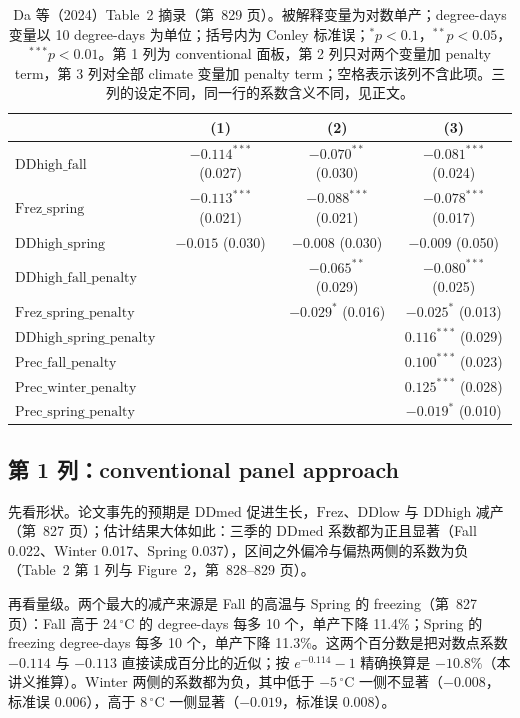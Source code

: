 \begin{table}[htbp]
\centering\small
\caption{Da 等（2024）Table~2 摘录（第~829 页）。被解释变量为对数单产；degree-days 变量以 10 degree-days 为单位；括号内为 Conley 标准误；$^{*}p<0.1$，$^{**}p<0.05$，$^{***}p<0.01$。第 1 列为 conventional 面板，第 2 列只对两个变量加 penalty term，第 3 列对全部 climate 变量加 penalty term；空格表示该列不含此项。三列的设定不同，同一行的系数含义不同，见正文。}
\label{tab:da-table2}
\begin{tabular}{@{}lccc@{}}
\toprule
 & (1) & (2) & (3) \\
\midrule
$\mathrm{DDhigh\_fall}$ & $-0.114^{***}$ (0.027) & $-0.070^{**}$ (0.030) & $-0.081^{***}$ (0.024) \\
$\mathrm{Frez\_spring}$ & $-0.113^{***}$ (0.021) & $-0.088^{***}$ (0.021) & $-0.078^{***}$ (0.017) \\
$\mathrm{DDhigh\_spring}$ & $-0.015$ (0.030) & $-0.008$ (0.030) & $-0.009$ (0.050) \\
\midrule
$\mathrm{DDhigh\_fall\_penalty}$ & & $-0.065^{**}$ (0.029) & $-0.080^{***}$ (0.025) \\
$\mathrm{Frez\_spring\_penalty}$ & & $-0.029^{*}$ (0.016) & $-0.025^{*}$ (0.013) \\
$\mathrm{DDhigh\_spring\_penalty}$ & & & $0.116^{***}$ (0.029) \\
$\mathrm{Prec\_fall\_penalty}$ & & & $0.100^{***}$ (0.023) \\
$\mathrm{Prec\_winter\_penalty}$ & & & $0.125^{***}$ (0.028) \\
$\mathrm{Prec\_spring\_penalty}$ & & & $-0.019^{*}$ (0.010) \\
\bottomrule
\end{tabular}
\end{table}

\subsection{第 1 列：conventional panel approach}

先看形状。论文事先的预期是 $\mathrm{DDmed}$ 促进生长，$\mathrm{Frez}$、$\mathrm{DDlow}$ 与 $\mathrm{DDhigh}$ 减产（第~827 页）；估计结果大体如此：三季的 $\mathrm{DDmed}$ 系数都为正且显著（Fall 0.022、Winter 0.017、Spring 0.037），区间之外偏冷与偏热两侧的系数为负（Table~2 第 1 列与 Figure~2，第~828--829 页）。

再看量级。两个最大的减产来源是 Fall 的高温与 Spring 的 freezing（第~827 页）：Fall 高于 24\,$^\circ$C 的 degree-days 每多 10 个，单产下降 11.4\%；Spring 的 freezing degree-days 每多 10 个，单产下降 11.3\%。这两个百分数是把对数点系数 $-0.114$ 与 $-0.113$ 直接读成百分比的近似；按 $e^{-0.114}-1$ 精确换算是 $-10.8\%$（本讲义推算）。Winter 两侧的系数都为负，其中低于 $-5\,^\circ$C 一侧不显著（$-0.008$，标准误 0.006），高于 8\,$^\circ$C 一侧显著（$-0.019$，标准误 0.008）。

